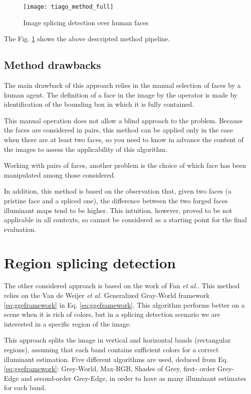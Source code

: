 \begin{figure}[h!]
  \centering
    \texttt{[image: tiago\_method\_full]}
    \caption{Image splicing detection over human faces}
    \label{fig:tiago_method_full}
\end{figure}

The Fig. \ref{fig:tiago_method_full} shows the above descripted method pipeline.

\subsection{Method drawbacks}

The main drawback of this approach relies in the manual selection of faces by a human agent. The definition of a face in the image by the operator is made by identification of the bounding box in which it is fully contained.

This manual operation does not allow a blind approach to the problem. Because the faces are considered in pairs, this method can be applied only in the case when there are at least two faces, so you need to know in advance the content of the images to assess the applicability of this algorithm.

Working with pairs of faces, another problem is the choice of which face has been manipulated among those considered. 

In addition, this method is based on the observation that, given two faces (a pristine face and a spliced one), the difference between the two forged faces illuminant maps tend to be higher. This intuition, however, proved to be not applicable in all contexts, so cannot be considered as a starting point for the final evaluation.

\section{Region splicing detection}

The other considered approach is based on the work of Fan \emph{et al.}\cite{fan2015image}. This method relies on the Van de Weijer \emph{et al.}\cite{van2007edge} Generalized Gray-World framework \ref{eq:ggeframework} in Eq. \ref{eq:ggeframework}. This algorithm performs better on a scene when it is rich of colors, but in a splicing detection scenario we are interested in a specific region of the image.

This approach splits the image in vertical and horizontal bands (rectangular regions), assuming that each band contains sufficient colors for a correct illuminant estimation. Five different algorithms are used, deduced from Eq. \ref{eq:ggeframework}: Grey-World, Max-RGB, Shades of Grey, first- order Grey-Edge and second-order Grey-Edge, in order to have as many illuminant estimates for each band.

